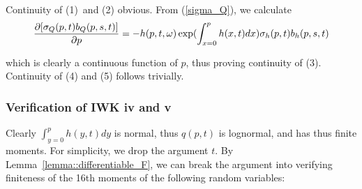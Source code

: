 \documentclass{article}
\begin{document}
Continuity of (1)\ and (2) obvious. From (\ref{sigma_Q}), we calculate
\begin{equation}
\frac{\partial \lbrack \sigma _{Q}(p,t)b_{Q}(p,s,t)]}{\partial p}=-{%
h(p,t,\omega )}\exp ({\int_{x=0}^{p}h(x,t)dx)}\sigma _{h}(p,t)b_{h}(p,s,t)
\label{dsigmadp}
\end{equation}

which is clearly a continuous function of $p$, thus proving continuity of
(3). Continuity of (4) and (5) follows trivially.

\subsubsection{Verification of IWK iv and v}

Clearly ${\int_{y=0}^{p}h(y,t)dy}$ is normal, thus $q(p,t)$ is lognormal,
and has thus finite moments. For simplicity, we drop the argument $t$. By
Lemma~\ref{lemma::differentiable_F}, we can break the argument into verifying finiteness of the 16th
moments of the following random variables:
\end{document}
